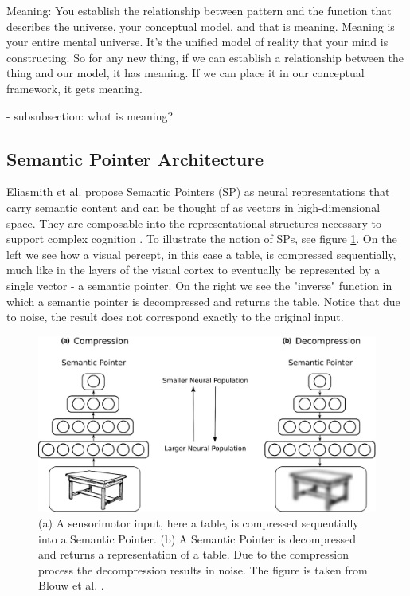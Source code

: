 Meaning: You establish the relationship between pattern and the function that describes the universe, your conceptual model, and that is meaning. Meaning is your entire mental universe. It's the unified model of reality that your mind is constructing. So for any new thing, if we can establish a relationship between the thing and our model, it has meaning. If we can place it in our conceptual framework, it gets meaning. 

- subsubsection: what is meaning?



\subsection{Semantic Pointer Architecture}
Eliasmith et al. propose Semantic Pointers (SP) as neural representations that carry semantic content and can be thought of as vectors in high-dimensional space. They are composable into the representational structures necessary to support complex cognition \cite{eliasmith2013build}. To illustrate the notion of SPs, see figure \ref{fig:sp}. On the left we see how a visual percept, in this case a table, is compressed sequentially, much like in the layers of the visual cortex to eventually be represented by a single vector - a semantic pointer. 
    On the right we see the "inverse" function in which a semantic pointer is decompressed and returns the table. Notice that due to noise, the result does not correspond exactly to the original input. 

\begin{figure}
    \centering
    \includegraphics[width=\textwidth]{../img/semPointer.jpg}
    \caption{(a) A sensorimotor input, here a table, is compressed sequentially into a Semantic Pointer. (b) A Semantic Pointer is decompressed and returns a representation of a table. Due to the compression process the decompression results in noise. The figure is taken from Blouw et al. \cite{blouw2016concepts}.}
    \label{fig:sp}
\end{figure}





